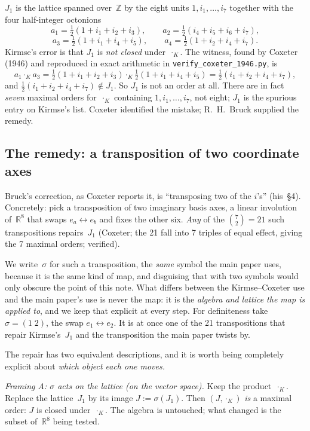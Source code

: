 \documentclass[11pt]{amsart}
\newcommand{\ZZ}{\mathbb{Z}}
\newcommand{\RR}{\mathbb{R}}
\begin{document}
$J_1$ is the lattice spanned over~$\ZZ$ by the eight units
$1, i_1, \ldots, i_7$ together with the four half-integer octonions
\[
  a_1 = \tfrac12(1{+}i_1{+}i_2{+}i_3), \qquad
  a_2 = \tfrac12(i_4{+}i_5{+}i_6{+}i_7),
\]
\[
  a_3 = \tfrac12(1{+}i_1{+}i_4{+}i_5), \qquad
  a_4 = \tfrac12(1{+}i_2{+}i_4{+}i_7).
\]
Kirmse's error is that $J_1$ is \emph{not closed} under~$\cdot_K$.
The witness, found by Coxeter (1946) and reproduced in exact
arithmetic in \texttt{verify\_coxeter\_1946.py}, is
\[
  a_1 \cdot_K a_3
  = \tfrac12(1{+}i_1{+}i_2{+}i_3)\cdot_K\tfrac12(1{+}i_1{+}i_4{+}i_5)
  = \tfrac12(i_1{+}i_2{+}i_4{+}i_7),
\]
and $\tfrac12(i_1{+}i_2{+}i_4{+}i_7) \notin J_1$.  So $J_1$ is not an
order at all.  There are in fact \emph{seven} maximal orders
for~$\cdot_K$ containing $1, i_1, \ldots, i_7$, not eight; $J_1$ is the spurious entry on Kirmse's list.
Coxeter identified the mistake; R.~H.~Bruck supplied the remedy.

\subsection*{The remedy: a transposition of two coordinate axes}

Bruck's correction, as Coxeter reports it, is ``transposing two of
the $i$'s'' (his~\S4).  Concretely: pick a transposition of two imaginary
basis axes, a linear involution of~$\RR^8$ that swaps
$e_a \leftrightarrow e_b$ and fixes the other six.  \emph{Any} of
the $\binom72 = 21$ such transpositions repairs~$J_1$ (Coxeter; the 21
fall into 7 triples of equal effect, giving the 7 maximal orders;
verified).

We write~$\sigma$ for such a transposition, the \emph{same} symbol the
main paper uses, because it is the same kind of map, and disguising
that with two symbols would only obscure the point of this note.  What
differs between the Kirmse--Coxeter use and the main paper's use is
never the map: it is the \emph{algebra and lattice the map is applied
to}, and we keep that explicit at every step.  For definiteness take
$\sigma = (1\;2)$, the swap $e_1 \leftrightarrow e_2$.  It is at
once one of the 21 transpositions that repair Kirmse's~$J_1$ and the
transposition the main paper twists by.

The repair has two equivalent descriptions, and it is worth being
completely explicit about \emph{which object each one moves.}

\smallskip
\noindent\emph{Framing A: $\sigma$ acts on the lattice (on the vector
space).}  Keep the product~$\cdot_K$.  Replace the lattice~$J_1$ by its
image $J := \sigma(J_1)$.  Then $(J, \cdot_K)$ \emph{is} a maximal order:
$J$ is closed under~$\cdot_K$.  The algebra is untouched; what changed
is the subset of~$\RR^8$ being tested.
\end{document}
